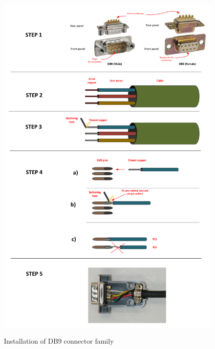 \begin{figure}
  \centering
  \includegraphics[angle=90,width=1\columnwidth]{figs/body03/FIGCRIMPDB9.pdf}\\
  \caption[Installation of DB9 connector family]{Installation of DB9 connector family}
  \label{FIG:CRIMPDB9}
\end{figure}
